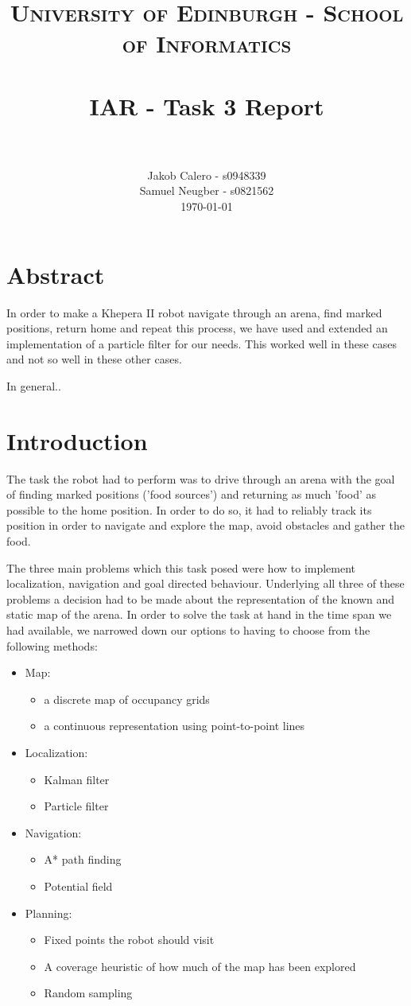 \documentclass[paper=a4, fontsize=12pt]{scrartcl}	%
\title{
\vspace{-1in} 	
\usefont{OT1}{bch}{b}{n}
\normalfont \normalsize \textsc{University of Edinburgh - School of Informatics}
\\ [25pt]
\horrule{0.5pt} \\[0.4cm]
\large IAR - Task 3 Report \\
\horrule{1pt} \\[0.5cm]
}
\author{
  \normalfont \normalsize
  Jakob Calero - s0948339\\[-3pt]\normalsize
  Samuel Neugber - s0821562\\[-3pt]\normalsize
  \today
}
\date{}
\numberwithin{equation}{section}		%
\numberwithin{figure}{section}			%
\numberwithin{table}{section}				%
\begin{document}
\maketitle					%
\section{Abstract}
In order to make a Khepera II robot navigate through an arena, find marked positions, return home and repeat this process, we have used and extended an implementation of a particle filter for our needs. This worked well in these cases and not so well in these other cases.

In general..

\section{Introduction}
The task the robot had to perform was to drive through an arena with the goal of finding marked positions ('food sources') and returning as much 'food' as possible to the home position. In order to do so, it had to reliably track its position in order to navigate and explore the map, avoid obstacles and gather the food.

The three main problems which this task posed were how to implement localization, navigation and goal directed behaviour. Underlying all three of these problems a decision had to be made about the representation of the known and static map of the arena. In order to solve the task at hand in the time span we had available, we narrowed down our options to having to choose from the following methods:

\begin{itemize}
\item Map: 
\begin{itemize}
\item a discrete map of occupancy grids
\item a continuous representation using point-to-point lines
\end{itemize}
\item Localization: 
\begin{itemize}
\item Kalman filter
\item Particle filter
\end{itemize}
\item Navigation:
\begin{itemize}
\item A* path finding
\item Potential field
\end{itemize}
\item Planning:
\begin{itemize}
\item Fixed points the robot should visit
\item A coverage heuristic of how much of the map has been explored
\item Random sampling
\end{itemize}
\end{itemize}
\end{document}
